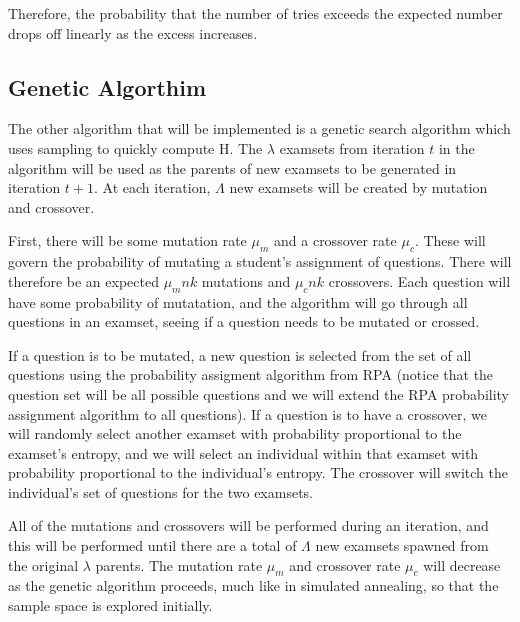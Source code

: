 \documentclass[psamsfonts]{amsart}
\begin{document}
Therefore, the probability that the number of tries exceeds the expected number drops off linearly as the excess increases.

\subsection{Genetic Algorthim}
 
The other algorithm that will be implemented is a genetic search algorithm which uses sampling to quickly compute $\mathrm{H}$. The $\lambda$ examsets from iteration $t$ in the algorithm will be used as the parents of new examsets to be generated in iteration $t+1$. At each iteration, $\Lambda$ new examsets will be created by mutation and crossover.

First, there will be some mutation rate $\mu_m$ and a crossover rate $\mu_c$. These will govern the probability of mutating a student's assignment of questions. There will therefore be an expected $\mu_m nk$ mutations and $\mu_c nk$ crossovers. Each question will have some probability of mutatation, and the algorithm will go through all questions in an examset, seeing if a question needs to be mutated or crossed. 

If a question is to be mutated, a new question is selected from the set of all questions using the probability assigment algorithm from RPA (notice that the question set will be all possible questions and we will extend the RPA probability assignment algorithm to all questions). If a question is to have a crossover, we will randomly select another examset with probability proportional to the examset's entropy, and we will select an individual within that examset with probability proportional to the individual's entropy. The crossover will switch the individual's set of questions for the two examsets. 

All of the mutations and crossovers will be performed during an iteration, and this will be performed until there are a total of $\Lambda$ new examsets spawned from the original $\lambda$ parents. The mutation rate $\mu_m$ and crossover rate $\mu_c$ will decrease as the genetic algorithm proceeds, much like in simulated annealing, so that the sample space is explored initially. 
\end{document}
